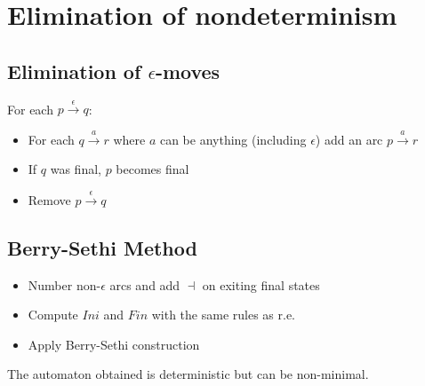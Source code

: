 \section{Elimination of nondeterminism}

\subsection{Elimination of $\epsilon$-moves}
For each $p \xrightarrow{\epsilon} q$:
\begin{itemize}
    \item For each $q \xrightarrow{a} r$ where $a$ can be anything (including $\epsilon$) add an arc $p \xrightarrow{a} r$
    \item If $q$ was final, $p$ becomes final
    \item Remove $p \xrightarrow{\epsilon} q$
\end{itemize}

\subsection{Berry-Sethi Method}
\begin{itemize}
    \item Number non-$\epsilon$ arcs and add $\dashv$ on exiting final states
    \item Compute $Ini$ and $Fin$ with the same rules as r.e.
    \item Apply Berry-Sethi construction
\end{itemize}
The automaton obtained is deterministic but can be non-minimal.
